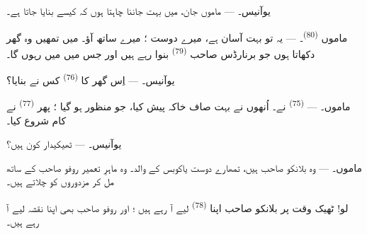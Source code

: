 %
%

\VUsaut{6.0mm}
\VUsaut{1.4mm}
\VUsaut{2.2mm}

\VUsaut{3.0mm}

\textsc{یوآنیس}۔ --- ماموں جان، میں بہت جاننا چاہتا ہوں کہ
 کیسے بنایا جاتا ہے۔

\textsc{ماموں} \textsuperscript{(80)}۔ --- یہ تو بہت آسان ہے، میرے
دوست ؛ میرے ساتھ آؤ۔ میں تمھیں وہ گھر دکھاتا ہوں جو برنارڈس صاحب
\textsuperscript{(79)} بنوا رہے ہیں اور جس میں میں رہوں گا۔

\textsc{یوآنیس}۔ --- اِس گھر کا  \textsuperscript{(76)}
کس نے بنایا؟

\textsc{ماموں}۔ ---  \textsuperscript{(75)} نے۔
اُنھوں نے بہت صاف خاکہ پیش کیا، جو منظور ہو گیا ؛ پھر
 \textsuperscript{(77)} نے کام شروع کیا۔

\textsc{یوآنیس}۔ --- ٹھیکیدار کون ہیں؟

\textsc{ماموں}۔ --- وہ بلانکو صاحب ہیں، تمھارے دوست یاکوبس کے والد۔
وہ ماہرِ تعمیر روفو صاحب کے ساتھ مل کر مزدوروں کو چلاتے ہیں۔

لو! ٹھیک وقت پر بلانکو صاحب اپنا 
\textsuperscript{(78)} لیے آ رہے ہیں ؛ اور روفو صاحب بھی اپنا نقشہ لیے
آ رہے ہیں۔

